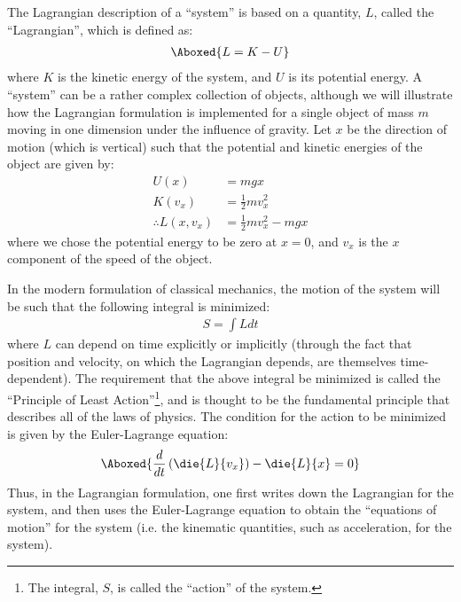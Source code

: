 The Lagrangian description of a ``system'' is based on a quantity, $L$, called the ``Lagrangian'', which is defined as:
\begin{align}
\Aboxed{L = K - U}
\end{align}
where $K$ is the kinetic energy of the system, and $U$ is its potential energy. A ``system'' can be a rather complex collection of objects, although we will illustrate how the Lagrangian formulation is implemented for a single object of mass $m$ moving in one dimension under the influence of gravity. Let $x$ be the direction of motion (which is vertical) such that the potential and kinetic energies of the object are given by:
\begin{align*}
U(x) &= mgx\\
K(v_x) &= \frac{1}{2}mv_x^2\\
\therefore L(x,v_x) &= \frac{1}{2}mv_x^2 - mgx
\end{align*}
where we chose the potential energy to be zero at $x=0$, and $v_x$ is the $x$ component of the speed of the object.

In the modern formulation of classical mechanics, the motion of the system will be such that the following integral is minimized:
\begin{align*}
S = \int Ldt
\end{align*}
where $L$ can depend on time explicitly or implicitly (through the fact that position and velocity, on which the Lagrangian depends, are themselves time-dependent). The requirement that the above integral be minimized is called the ``Principle of Least Action''\footnote{The integral, $S$, is called the ``action'' of the system.}, and is thought to be the fundamental principle that describes all of the laws of physics. The condition for the action to be minimized is given by the Euler-Lagrange equation:
\begin{align}
\Aboxed{\frac{d}{dt}\left(\die{L}{v_x}\right)-\die{L}{x} = 0}
\end{align}
Thus, in the Lagrangian formulation, one first writes down the Lagrangian for the system, and then uses the Euler-Lagrange equation to obtain the ``equations of motion'' for the system (i.e. the kinematic quantities, such as acceleration, for the system). 

